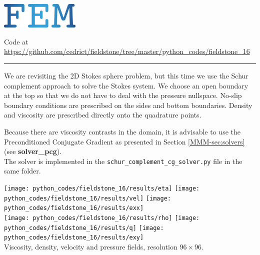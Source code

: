 \includegraphics[height=1.25cm]{images/pictograms/FEM}



\begin{center}
\inpython
{\small Code at \url{https://github.com/cedrict/fieldstone/tree/master/python_codes/fieldstone_16}}
\end{center}

\par\noindent\rule{\textwidth}{0.4pt}


We are revisiting the 2D Stokes sphere problem, but this time 
we use the Schur complement approach to solve the Stokes system. 
We choose an open boundary at the top so that we do not have to deal with the pressure 
nullspace. No-slip boundary conditions are prescribed on the sides and bottom boundaries.
Density and viscosity are prescribed directly onto the quadrature points. 

Because there are viscosity contrasts in the domain, it is advisable 
to use the Preconditioned Conjugate Gradient 
as presented in Section \ref{MMM-sec:solvers} (see {\bf solver\_pcg}).\\
The solver is implemented in the {\tt schur\_complement\_cg\_solver.py} file in the same folder.  

\begin{center} 
\texttt{[image: python\_codes/fieldstone\_16/results/eta]}
\texttt{[image: python\_codes/fieldstone\_16/results/vel]}
\texttt{[image: python\_codes/fieldstone\_16/results/exx]}\\
\texttt{[image: python\_codes/fieldstone\_16/results/rho]}
\texttt{[image: python\_codes/fieldstone\_16/results/q]}
\texttt{[image: python\_codes/fieldstone\_16/results/exy]}\\
{\captionfont Viscosity, density, velocity and pressure fields, resolution $96\times 96$.}
\end{center} 

